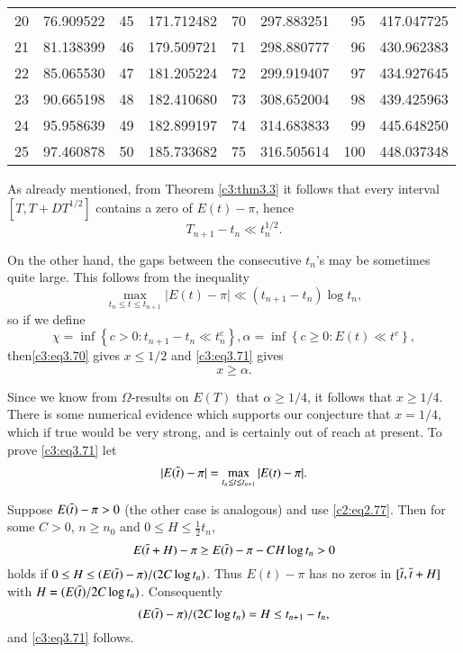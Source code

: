 {\begin{longtable}{|rr|rr|rr|rr|}
  20& 76.909522 & 45 & 171.712482& 70& 297.883251& 95& 417.047725 \\
  21& 81.138399 & 46 & 179.509721& 71& 298.880777& 96& 430.962383\\
  22& 85.065530 & 47 & 181.205224& 72& 299.919407& 97& 434.927645\\
  23& 90.665198 & 48 & 182.410680& 73& 308.652004& 98& 439.425963\\
  24& 95.958639 & 49 & 182.899197& 74& 314.683833& 99& 445.648250\\
  25& 97.460878 & 50 & 185.733682&75 & 316.505614& 100& 448.037348\\
  \hline
\end{longtable}}

As already mentioned, from Theorem \ref{c3:thm3.3} it follows that
every interval $[T, T + DT^{1/2}]$ contains a zero of $E(t)-\pi$, hence 
\begin{equation}
  T_{n+1} - t_n \ll t_n^{1/2}.\label{c3:eq3.70}
\end{equation}

On the other hand, the gaps between the consecutive $t_n$'s may be
sometimes quite large. This follows from the inequality
\begin{equation}
  \max_{t_n \leq t \leq t_{n+1}} |E(t) - \pi| \ll (t_{n+1} - t_n)
  \log t_n,\label{c3:eq3.71}
\end{equation}
so if we define
$$
\chi = \inf \left\{ c > 0: t_{n+1} - t_n \ll t_n^c\right\}, \alpha =
\inf \left\{ c \geq 0: E(t) \ll t^c\right\},
$$
then\pageoriginale \eqref{c3:eq3.70} gives $x\leq 1/2$ and \eqref{c3:eq3.71}
gives
\begin{equation}
 x \geq \alpha.\label{c3:eq3.72}
\end{equation}

Since we know from $\Omega$-results on $E(T)$ that $\alpha \geq 1/4$,
it follows that $x \geq 1/4$. There is some numerical evidence
which supports our conjecture that $x = 1/4$, which if true would
be very strong, and is certainly out of reach at present. To prove
\eqref{c3:eq3.71} let
$$
|E (\overline{t}) -  \pi|= \max_{t_n \leq t \leq t_{n+1}} |E(t) - \pi|.
$$

Suppose $E(\overline{t})- \pi > 0$ (the other case is analogous) and use
\eqref{c2:eq2.77}. Then for some $C> 0$, $n \geq n_0$ and $0 \leq
H\leq \frac{1}{2} t_n$,
$$
E(\overline{t}+H)- \pi \geq E(\overline{t}) - \pi - CH \log t_n > 0
$$ 
holds if $0 \leq H \leq (E(\overline{t})-\pi)/ (2C \log t_n)$. Thus $E(t)-
\pi$ has no zeros in $[\overline{t}, \overline{t}+ H]$ with $H= (E(\overline{t})/2C \log
t_n)$. Consequently
$$
(E(\overline{t})- \pi)/(2C \log t_n)= H\leq t_{n+1} - t_n,
$$
and \eqref{c3:eq3.71} follows.

